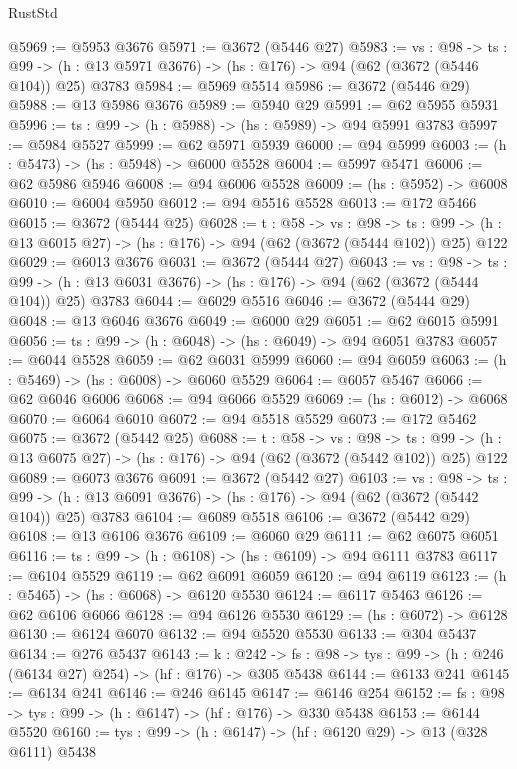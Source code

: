 \begin{lexlean}{RustStd}
\begin{coremodule}
{\begin{coremodule}
{{{{{{{{{@5969 := @5953 @3676
@5971 := @3672 (@5446 @27)
@5983 := {vs : @98} ->
  {ts : @99} -> (h : @13 @5971 @3676) -> (hs : @176) -> @94 (@62 (@3672 (@5446 @104)) @25) @3783
@5984 := @5969 @5514
@5986 := @3672 (@5446 @29)
@5988 := @13 @5986 @3676
@5989 := @5940 @29
@5991 := @62 @5955 @5931
@5996 := {ts : @99} -> (h : @5988) -> (hs : @5989) -> @94 @5991 @3783
@5997 := @5984 @5527
@5999 := @62 @5971 @5939
@6000 := @94 @5999
@6003 := (h : @5473) -> (hs : @5948) -> @6000 @5528
@6004 := @5997 @5471
@6006 := @62 @5986 @5946
@6008 := @94 @6006 @5528
@6009 := (hs : @5952) -> @6008
@6010 := @6004 @5950
@6012 := @94 @5516 @5528
@6013 := @172 @5466
@6015 := @3672 (@5444 @25)
@6028 := {t : @58} ->
  {vs : @98} ->
  {ts : @99} -> (h : @13 @6015 @27) -> (hs : @176) -> @94 (@62 (@3672 (@5444 @102)) @25) @122
@6029 := @6013 @3676
@6031 := @3672 (@5444 @27)
@6043 := {vs : @98} ->
  {ts : @99} -> (h : @13 @6031 @3676) -> (hs : @176) -> @94 (@62 (@3672 (@5444 @104)) @25) @3783
@6044 := @6029 @5516
@6046 := @3672 (@5444 @29)
@6048 := @13 @6046 @3676
@6049 := @6000 @29
@6051 := @62 @6015 @5991
@6056 := {ts : @99} -> (h : @6048) -> (hs : @6049) -> @94 @6051 @3783
@6057 := @6044 @5528
@6059 := @62 @6031 @5999
@6060 := @94 @6059
@6063 := (h : @5469) -> (hs : @6008) -> @6060 @5529
@6064 := @6057 @5467
@6066 := @62 @6046 @6006
@6068 := @94 @6066 @5529
@6069 := (hs : @6012) -> @6068
@6070 := @6064 @6010
@6072 := @94 @5518 @5529
@6073 := @172 @5462
@6075 := @3672 (@5442 @25)
@6088 := {t : @58} ->
  {vs : @98} ->
  {ts : @99} -> (h : @13 @6075 @27) -> (hs : @176) -> @94 (@62 (@3672 (@5442 @102)) @25) @122
@6089 := @6073 @3676
@6091 := @3672 (@5442 @27)
@6103 := {vs : @98} ->
  {ts : @99} -> (h : @13 @6091 @3676) -> (hs : @176) -> @94 (@62 (@3672 (@5442 @104)) @25) @3783
@6104 := @6089 @5518
@6106 := @3672 (@5442 @29)
@6108 := @13 @6106 @3676
@6109 := @6060 @29
@6111 := @62 @6075 @6051
@6116 := {ts : @99} -> (h : @6108) -> (hs : @6109) -> @94 @6111 @3783
@6117 := @6104 @5529
@6119 := @62 @6091 @6059
@6120 := @94 @6119
@6123 := (h : @5465) -> (hs : @6068) -> @6120 @5530
@6124 := @6117 @5463
@6126 := @62 @6106 @6066
@6128 := @94 @6126 @5530
@6129 := (hs : @6072) -> @6128
@6130 := @6124 @6070
@6132 := @94 @5520 @5530
@6133 := @304 @5437
@6134 := @276 @5437
@6143 := {k : @242} ->
  {fs : @98} -> {tys : @99} -> (h : @246 (@6134 @27) @254) -> (hf : @176) -> @305 @5438
@6144 := @6133 @241
@6145 := @6134 @241
@6146 := @246 @6145
@6147 := @6146 @254
@6152 := {fs : @98} -> {tys : @99} -> (h : @6147) -> (hf : @176) -> @330 @5438
@6153 := @6144 @5520
@6160 := {tys : @99} -> (h : @6147) -> (hf : @6120 @29) -> @13 (@328 @6111) @5438
}}}}}}}}}
\end{coremodule}}
\end{coremodule}
\end{lexlean}

